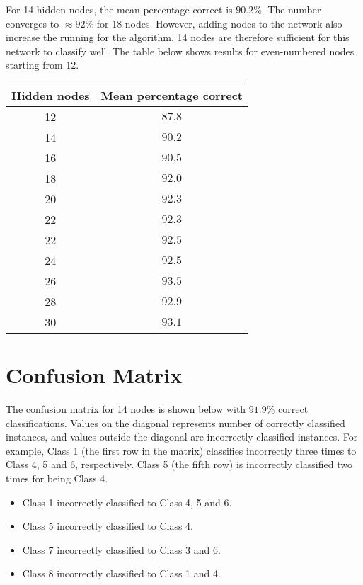 \documentclass{article}
\begin{document}
\noindent For 14 hidden nodes, the mean percentage correct is $90.2\%$. The number converges to $\approx 92\%$ for 18 nodes. However, adding nodes to the network also increase the running for the algorithm. 14 nodes are therefore sufficient for this network to classify well. The table below shows results for even-numbered nodes starting from 12.

\begin{center}
\begin{tabular}{cc}
\toprule
Hidden nodes & Mean percentage correct \\
\midrule
12 & $87.8$\\
14 & $90.2$\\
16 & $90.5$\\
18 & $92.0$\\
20 & $92.3$\\
22 & $92.3$\\
22 & $92.5$\\
24 & $92.5$\\
26 & $93.5$\\
28 & $92.9$\\
30 & $93.1$\\
\bottomrule
\end{tabular}
\end{center}

\section*{Confusion Matrix}

\noindent The confusion matrix for 14 nodes is shown below with $91.9\%$ correct classifications. Values on the diagonal represents number of correctly classified instances, and values outside the diagonal are incorrectly classified instances. For example, Class 1 (the first row in the matrix) classifies incorrectly three times to Class 4, 5 and 6, respectively. Class 5 (the fifth row) is incorrectly classified two times for being Class 4.

\begin{itemize}
    \item Class 1 incorrectly classified to Class 4, 5 and 6.
    \item Class 5 incorrectly classified to Class 4.
    \item Class 7 incorrectly classified to Class 3 and 6.
    \item Class 8 incorrectly classified to Class 1 and 4.
\end{itemize}
\end{document}

